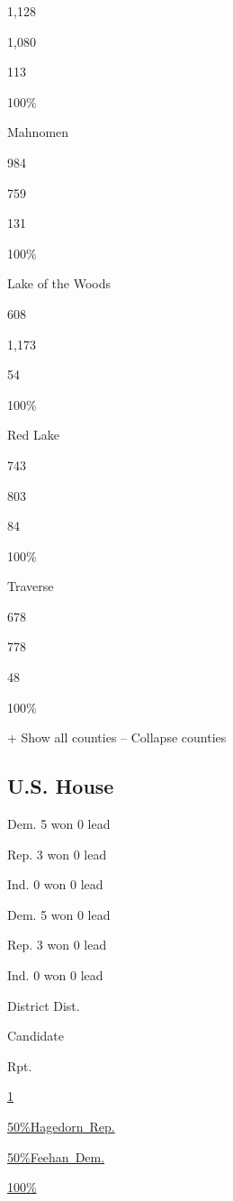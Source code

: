 1,128

1,080

113

100\%

Mahnomen

984

759

131

100\%

Lake of the Woods

608

1,173

54

100\%

Red Lake

743

803

84

100\%

Traverse

678

778

48

100\%

+ Show all counties -- Collapse counties

\hypertarget{us-house}{%
\subsection{U.S. House}\label{us-house}}

Dem. 5 won 0 lead

Rep. 3 won 0 lead

Ind. 0 won 0 lead

Dem. 5 won 0 lead

Rep. 3 won 0 lead

Ind. 0 won 0 lead

District Dist.

Candidate

Rpt.

\href{https://www.nytimes3xbfgragh.onion/elections/results/minnesota-house-district-1}{1}

\href{https://www.nytimes3xbfgragh.onion/elections/results/minnesota-house-district-1}{
50\%Hagedorn~Rep.}

\href{https://www.nytimes3xbfgragh.onion/elections/results/minnesota-house-district-1}{
50\%Feehan~Dem.}

\href{https://www.nytimes3xbfgragh.onion/elections/results/minnesota-house-district-1}{100\%}

\href{https://www.nytimes3xbfgragh.onion/elections/results/minnesota-house-district-1}{}

